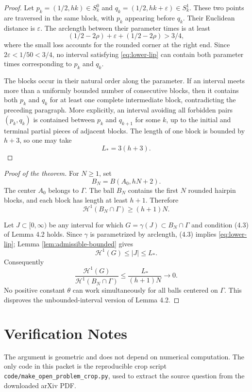 \documentclass[11pt]{article}
\newcommand{\HH}{\mathcal H}
\begin{document}
\begin{proof}
Let \(p_k=(1/2,hk)\in S_k^0\) and \(q_k=(1/2,hk+\varepsilon)\in S_k^1\).
These two points are traversed in the same block, with \(p_k\) appearing before
\(q_k\).  Their Euclidean distance is \(\varepsilon\).  The arclength between
their parameter times is at least
\[
  (1/2-2\rho)+\varepsilon+(1/2-2\rho)>3/4,
\]
where the small loss accounts for the rounded corner at the right end.  Since
\(2\varepsilon<1/50<3/4\), no interval satisfying \eqref{eq:lower-lip} can
contain both parameter times corresponding to \(p_k\) and \(q_k\).

The blocks occur in their natural order along the parameter.  If an interval
meets more than a uniformly bounded number of consecutive blocks, then it
contains both \(p_k\) and \(q_k\) for at least one complete intermediate block,
contradicting the preceding paragraph.  More explicitly, an interval avoiding
all forbidden pairs \((p_k,q_k)\) is contained between \(p_k\) and \(q_{k+1}\)
for some \(k\), up to the initial and terminal partial pieces of adjacent
blocks.  The length of one block is bounded by \(h+3\), so one may take
\[
  L_* = 3(h+3).
\]
\end{proof}

\begin{proof}[Proof of the theorem]
For \(N\ge1\), set
\[
  B_N=B(A_0,hN+2).
\]
The center \(A_0\) belongs to \(\Gamma\).  The ball \(B_N\) contains the first
\(N\) rounded hairpin blocks, and each block has length at least \(h+1\).
Therefore
\[
  \HH^1(B_N\cap\Gamma)\ge (h+1)N.
\]

Let \(J\subset[0,\infty)\) be any interval for which
\(G=\gamma(J)\subset B_N\cap\Gamma\) and condition (4.3) of Lemma 4.2 holds.
Since \(\gamma\) is parametrized by arclength, (4.3) implies
\eqref{eq:lower-lip}; Lemma \ref{lem:admissible-bounded} gives
\[
  \HH^1(G)\le |J|\le L_*.
\]
Consequently
\[
  \frac{\HH^1(G)}{\HH^1(B_N\cap\Gamma)}
  \le \frac{L_*}{(h+1)N}\longrightarrow 0.
\]
No positive constant \(\theta\) can work simultaneously for all balls centered
on \(\Gamma\).  This disproves the unbounded-interval version of Lemma 4.2.
\end{proof}

\section*{Verification Notes}

The argument is geometric and does not depend on numerical computation.  The
only code in this packet is the reproducible crop script
\texttt{code/make\_open\_problem\_crop.py}, used to extract the source
question from the downloaded arXiv PDF.
\end{document}
